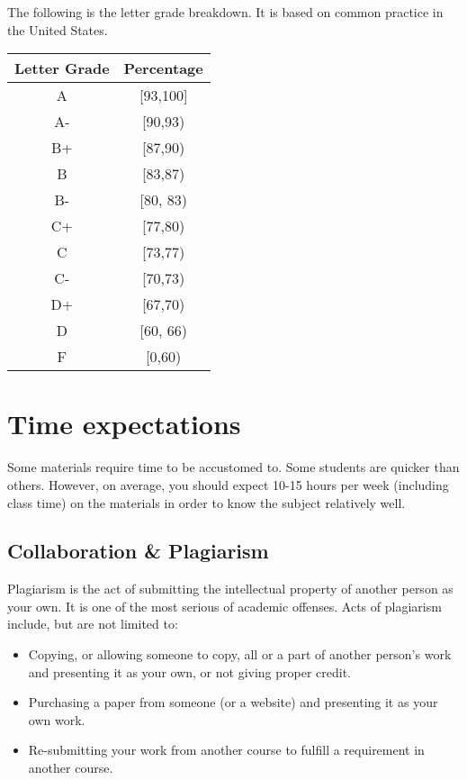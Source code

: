 \documentclass[
  openany]{book}
\begin{document}
The following is the letter grade breakdown. It is based on
common practice in the United States.

\begin{longtable}[]{@{}cc@{}}
\toprule\noalign{}
\textbf{Letter Grade} & \textbf{Percentage} \\
\midrule\noalign{}
\endhead
\bottomrule\noalign{}
\endlastfoot
A & {[}93,100{]} \\
A- & {[}90,93) \\
B+ & {[}87,90) \\
B & {[}83,87) \\
B- & {[}80, 83) \\
C+ & {[}77,80) \\
C & {[}73,77) \\
C- & {[}70,73) \\
D+ & {[}67,70) \\
D & {[}60, 66) \\
F & {[}0,60) \\
\end{longtable}

\section*{Time expectations}\label{time-expectations}

Some materials require time to be accustomed to. Some students are quicker than
others. However, on average, you should expect 10-15 hours per week (including class time)
on the materials in order to know the subject relatively well.

\subsection*{Collaboration \& Plagiarism}\label{collaboration-plagiarism}

Plagiarism is the act of submitting the intellectual property of another person as your own. It is one of the most serious of academic offenses. Acts of plagiarism include, but are not limited to:

\begin{itemize}
\item
  Copying, or allowing someone to copy, all or a part of another person's work and presenting it as your own, or not giving proper credit.
\item
  Purchasing a paper from someone (or a website) and presenting it as your own work.
\item
  Re-submitting your work from another course to fulfill a requirement in another course.
\end{itemize}
\end{document}
